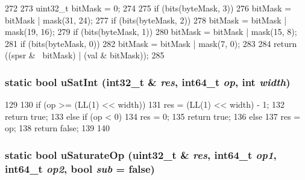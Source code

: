 \begin{DoxyCode}
272     {
273         uint32_t bitMask = 0;
274 
275         if (bits(byteMask, 3))
276             bitMask = bitMask | mask(31, 24);
277         if (bits(byteMask, 2))
278             bitMask = bitMask | mask(19, 16);
279         if (bits(byteMask, 1))
280             bitMask = bitMask | mask(15, 8);
281         if (bits(byteMask, 0))
282             bitMask = bitMask | mask(7, 0);
283 
284         return ((spsr & ~bitMask) | (val & bitMask));
285     }
\end{DoxyCode}
\hypertarget{classArmISA_1_1ArmStaticInst_a1836673d51155a1d5792744da88eb51b}{
\subsubsection[{uSatInt}]{\setlength{\rightskip}{0pt plus 5cm}static bool uSatInt (int32\_\-t \& {\em res}, \/  int64\_\-t {\em op}, \/  int {\em width})}}
\label{classArmISA_1_1ArmStaticInst_a1836673d51155a1d5792744da88eb51b}



\begin{DoxyCode}
129     {
130         if (op >= (LL(1) << width)) {
131             res = (LL(1) << width) - 1;
132             return true;
133         } else if (op < 0) {
134             res = 0;
135             return true;
136         } else {
137             res = op;
138             return false;
139         }
140     }
\end{DoxyCode}
\hypertarget{classArmISA_1_1ArmStaticInst_a588c48bae73d27c932022c7738612e28}{
\subsubsection[{uSaturateOp}]{\setlength{\rightskip}{0pt plus 5cm}static bool uSaturateOp ({\bf uint32\_\-t} \& {\em res}, \/  int64\_\-t {\em op1}, \/  int64\_\-t {\em op2}, \/  bool {\em sub} = {\ttfamily false})}}
\label{classArmISA_1_1ArmStaticInst_a588c48bae73d27c932022c7738612e28}



